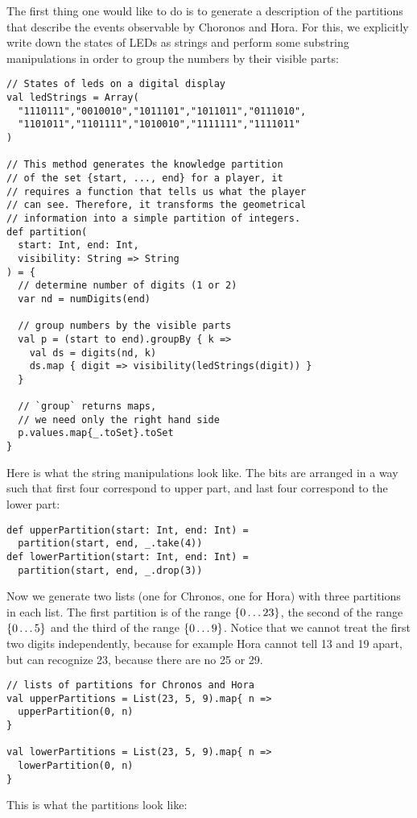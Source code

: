 \documentclass{scrartcl}
\begin{document}
The first thing one would like to do is to generate
a description of the partitions 
that describe the events observable by Choronos and Hora.
For this, we explicitly write down the states of LEDs as
strings and perform some substring manipulations in 
order to group the numbers by their visible parts:
\begin{lstlisting}
// States of leds on a digital display
val ledStrings = Array(
  "1110111","0010010","1011101","1011011","0111010",
  "1101011","1101111","1010010","1111111","1111011"
)

// This method generates the knowledge partition 
// of the set {start, ..., end} for a player, it
// requires a function that tells us what the player
// can see. Therefore, it transforms the geometrical
// information into a simple partition of integers.
def partition(
  start: Int, end: Int, 
  visibility: String => String
) = {
  // determine number of digits (1 or 2)
  var nd = numDigits(end)

  // group numbers by the visible parts
  val p = (start to end).groupBy { k =>
    val ds = digits(nd, k)
    ds.map { digit => visibility(ledStrings(digit)) }
  }

  // `group` returns maps, 
  // we need only the right hand side
  p.values.map{_.toSet}.toSet
}
\end{lstlisting}
Here is what the string manipulations look like.
The bits are arranged in a way such that first four 
correspond to upper part, and last four correspond to
the lower part:
\begin{lstlisting}
def upperPartition(start: Int, end: Int) = 
  partition(start, end, _.take(4))
def lowerPartition(start: Int, end: Int) =
  partition(start, end, _.drop(3))
\end{lstlisting}
Now we generate two lists (one for Chronos, one for Hora) with three partitions in each list. 
The first partition is of the range ${\left\{0\dots 23\right\}}$, 
the second of the range ${\left\{0\dots 5\right\}}$ and the third 
of the range ${\left\{0\dots 9\right\}}$. Notice that we cannot
treat the first two digits independently, because for 
example Hora cannot tell 13 and 19 apart, but can 
recognize 23, because there are no 25 or 29.
\begin{lstlisting}
// lists of partitions for Chronos and Hora
val upperPartitions = List(23, 5, 9).map{ n => 
  upperPartition(0, n)
}

val lowerPartitions = List(23, 5, 9).map{ n =>
  lowerPartition(0, n)
}
\end{lstlisting}
This is what the partitions look like:
\end{document}
